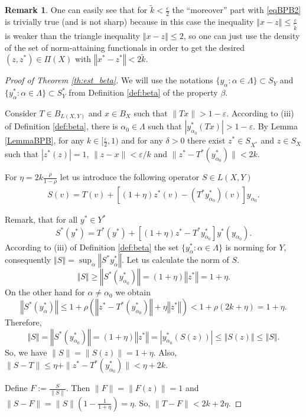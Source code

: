 \documentclass[11pt,a4paper]{amsart}
\newcommand{\eps}{\varepsilon}
\newcommand{\norm}[1]{\left\Vert#1\right\Vert}
\numberwithin{equation}{section}
\theoremstyle{plain}
\theoremstyle{definition}
\newtheorem{remark}[theorem]{Remark}
\renewcommand{\leq}{\leqslant}
\renewcommand{\geq}{\geqslant}
\renewcommand{\le}{\leqslant}
\begin{document}
\begin{remark}\label{rem_attain}
One can easily see that for $\tilde k < \frac{\eps}{2}$ the ``moreover'' part with \eqref{eqBPB2} is trivially true (and is not sharp) because in this case the inequality $\norm{x-{z}} \le \frac{\eps}{\tilde k}$ is weaker than the triangle inequality  $\norm{x-{z}} \le 2$, so one can just use the density of the set of norm-attaining functionals in order to get the desired  $(z,z^*)\in \Pi(X)$ with $\norm{x^*-{z}^*} <  2\tilde{k}$. 
\end{remark}

\begin{proof}[Proof of Theorem \ref{th:est_beta}]
We will use the notations $\{y_\alpha: \alpha\in \Lambda\}\subset S_Y$ and $\{y^*_\alpha: \alpha\in  \Lambda\}\subset S_Y^*$ from Definition \ref{def:beta} of  the property $\beta$.  

Consider $T\in B_{L(X,Y)}$ and $x\in B_X$ such that $\|Tx\|> 1-\eps$. 
According to (iii) of Definition \ref{def:beta}, there is $\alpha_0\in \Lambda$ such that $|y^*_{\alpha_0}(Tx)|> 1-\eps$. By Lemma \ref{LemmaBPB}, for
any  $k \in [\frac{\eps}{2}, 1)$ and for any $\delta>0$ there exist $z^*\in S_{X^*}$ and $z\in S_X$ such that $|z^*(z)|=1$, $\|z-x\|< \eps/k$ and $\|z^*-T^*(y^*_{\alpha_0})\|< 2k$.

For $\eta = 2k\frac{\rho}{1-\rho}$ let us introduce the following operator $S\in L(X,Y)$
\begin{align}\label{form_oper}
S(v) = T(v)+[(1+\eta)z^*(v)-(T^*y^*_{\alpha_0})(v)]y_{\alpha_0}.
\end{align}


Remark, that for all $y^*\in Y^*$
$$
S^*(y^*) = T^*(y^*)+[(1+\eta)z^* -T^*y^*_{\alpha_0}]y^*(y_{\alpha_0}).
$$
According to (iii) of Definition \ref{def:beta} the set $\{y^*_{\alpha}: \alpha \in \Lambda\}$ is norming for $Y$, consequently $\norm{S} = \sup_\alpha \norm{S^*{y^*_{\alpha}}}$.  Let us calculate the norm of $S$. 
$$\norm{S} \geq \norm{S^*(y^*_{\alpha_0})} = (1+\eta)\norm{z^*} = 1+\eta.$$
On the other hand for $\alpha \neq \alpha_0$ we obtain
$$
\norm{S^*(y^*_{\alpha})}\leq 1+\rho (\norm{z^* - T^*(y^*_{\alpha_0})} + \eta\norm{z^*})< 1+\rho(2k+\eta) = 1+\eta.
$$
Therefore, 
$$
\norm{S} = \norm{S^*(y^*_{\alpha_0})} = (1+\eta)\norm{z^*}=|y^*_{\alpha_0}(S(z))|\leq \norm{S(z)}\leq\norm{S}.
$$
So, we have $\|S\|=\|S(z)\|=1+\eta$. Also,
 $\|S-T\| \le \eta + \|z^*-T^*(y^*_{\alpha_0})\| < \eta + 2k$.


Define $F:=\frac{S}{\|S\|}$. Then $\|F\|=\|F(z)\|=1$ and $\|S - F\|=\|S\|(1-\frac{1}{1+\eta})=\eta$. So, $\|T-F\|< 2k+2\eta$. 


\end{proof}
\end{document}
